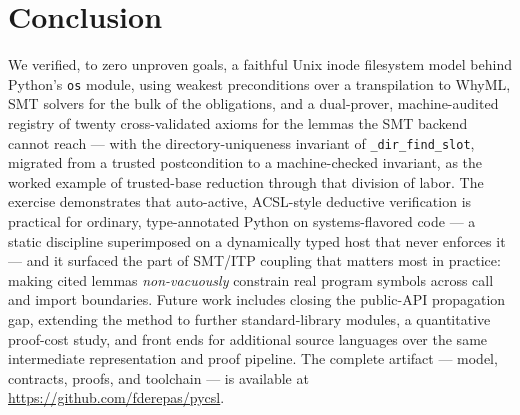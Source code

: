 \documentclass[11pt]{article}
\newcommand{\whyml}{\textsf{WhyML}}
\newcommand{\osmod}{\texttt{os}}
\begin{document}
\section{Conclusion}

We verified, to zero unproven goals, a faithful Unix inode filesystem model
behind Python's \osmod{} module, using weakest preconditions over a
transpilation to \whyml{}, SMT solvers for the bulk of the obligations, and
a dual-prover, machine-audited registry of twenty cross-validated axioms for
the lemmas the SMT backend cannot reach --- with the directory-uniqueness
invariant of \texttt{\_dir\_find\_slot}, migrated from a trusted
postcondition to a machine-checked invariant, as the worked example of
trusted-base reduction through that division of labor.
The exercise demonstrates that auto-active, ACSL-style deductive
verification is practical for ordinary, type-annotated Python on
systems-flavored code --- a static discipline superimposed on a dynamically
typed host that never enforces it --- and it surfaced the part of SMT/ITP coupling that
matters most in practice: making cited lemmas \emph{non-vacuously} constrain
real program symbols across call and import boundaries. Future work includes
closing the public-API propagation gap, extending the method to further
standard-library modules, a quantitative proof-cost study, and front ends
for additional source languages over the same intermediate representation
and proof pipeline. The complete artifact --- model, contracts, proofs, and
toolchain --- is available at \url{https://github.com/fderepas/pycsl}.
\end{document}
